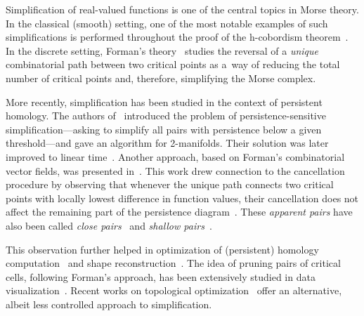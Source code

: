\documentclass[a4paper,12pt, USenglish,cleveref,autoref,thm-restate]{article}
\newcommand\jakub[1]{\textcolor{blue}{[JL: #1]}}
\newcommand\bartek[1]{\textcolor{violet}{[BF: #1]}}
\newcommand\dmitriy[1]{\textcolor{teal}{[DM: #1]}}
\begin{document}

Simplification of real-valued functions is one of the central topics in Morse theory.
 In the classical (smooth) setting, one of the most notable examples of such simplifications is performed throughout the proof of the h-cobordism theorem~\cite{Milnor:Hcobord, Milnor:morse}.
In the discrete setting, Forman's theory~\cite{Forman1998a, Forman1998b} studies the reversal of a \emph{unique} combinatorial path between two critical points as a~way of reducing the total number of critical points and, therefore, simplifying the Morse complex.

\noindent More recently,
simplification has been studied in the context of persistent homology.
The authors of~\cite{simplification2d} introduced the problem of persistence-sensitive simplification---asking to simplify all pairs with persistence below a given threshold---and gave an algorithm for 2-manifolds. Their solution was later improved to linear time~\cite{Attali2009}. Another approach, based on Forman’s combinatorial vector fields, was presented in~\cite{Bauer:2012aa}. This work drew connection to the cancellation procedure
by observing that whenever the unique path connects two critical points with locally lowest difference in function values,
    their cancellation does not affect the remaining part of the persistence diagram~\cite{Bauer:2012aa}.
    These \emph{apparent pairs} have also been called \emph{close pairs}~\cite{DeRoSh2015}  and \emph{shallow pairs}~\cite{EdelMroz2023}. 

\noindent This observation further helped in optimization of (persistent) homology computation~\cite{Bauer2021} and shape reconstruction~\cite{BauerRoll2024}.
The idea of pruning pairs of critical cells, following Forman's approach, has been extensively studied in data visualization~\cite{ComicDeFloriani2008, CoFlIuMa2016, ImprovedRoad, FeIuFlWe2014, Gunther:2012aa, GyBrHaPa2008, RoWoSh2011}.
Recent works on topological optimization~\cite{GaGaSkGu2020, BigSteps} offer an alternative, albeit less controlled approach to simplification.
    
\end{document}
